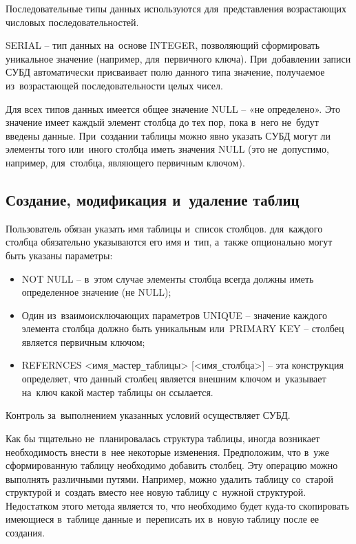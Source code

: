 \documentclass{ou}
\begin{document}
Последовательные типы данных используются для~представления возрастающих числовых последовательностей. 

SERIAL -- тип данных на~основе INTEGER, позволяющий сформировать уникальное значение (например, для~первичного ключа). При~добавлении записи СУБД автоматически присваивает полю данного типа значение, получаемое из~возрастающей последовательности целых чисел. 

Для всех типов данных имеется общее значение NULL -- «не определено». Это значение имеет каждый элемент столбца до тех пор, пока в~него не~будут введены данные. При~создании таблицы можно явно указать СУБД могут ли элементы того или~иного столбца иметь значения NULL (это не~допустимо, например, для~столбца, являющего первичным ключом). 
\subsection{Создание, модификация и~удаление таблиц}
Пользователь обязан указать имя таблицы и~список столбцов. для~каждого столбца обязательно указываются его имя и~тип, а~также опционально могут быть указаны параметры: 
\begin{itemize}[label=-, leftmargin=0em, itemindent=3.35em, nosep]
\item NOT NULL -- в~этом случае элементы столбца всегда должны иметь определенное значение (не NULL);
\item Один из~взаимоисключающих параметров UNIQUE -- значение каждого элемента столбца должно быть уникальным или~PRIMARY KEY -- столбец является первичным ключом;
\item REFERNCES <имя\verb|_|мастер\verb|_|таблицы> [<имя\verb|_|столбца>] -- эта конструкция определяет, что данный столбец является внешним ключом и~указывает на~ключ какой мастер таблицы он ссылается.
\end{itemize}

Контроль за~выполнением указанных условий осуществляет СУБД.

Как бы тщательно не~планировалась структура таблицы, иногда возникает необходимость внести в~нее некоторые изменения. Предположим, что в~уже сформированную таблицу необходимо добавить столбец. Эту операцию можно выполнять различными путями. Например, можно удалить таблицу со~старой структурой и~создать вместо нее новую таблицу с~нужной структурой. Недостатком этого метода является то, что необходимо будет куда-то скопировать имеющиеся в~таблице данные и~переписать их в~новую таблицу после ее создания. 
\end{document}

